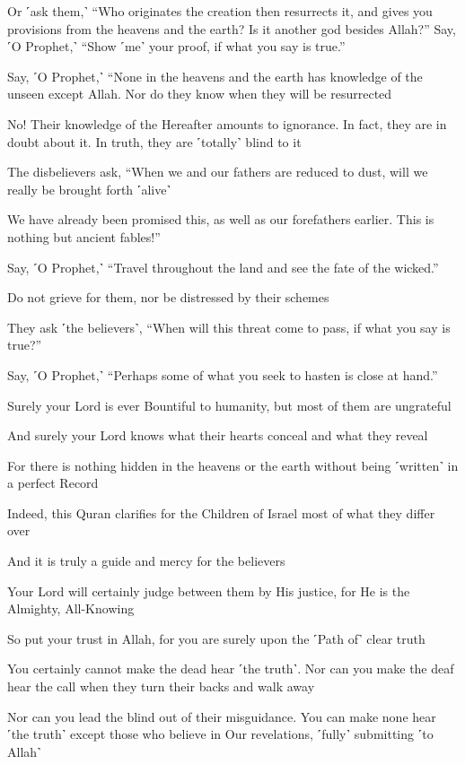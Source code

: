 Or ˹ask them,˺ “Who originates the creation then resurrects it, and gives you provisions from the heavens and the earth? Is it another god besides Allah?” Say, ˹O Prophet,˺ “Show ˹me˺ your proof, if what you say is true.”

Say, ˹O Prophet,˺ “None in the heavens and the earth has knowledge of the unseen except Allah. Nor do they know when they will be resurrected

No! Their knowledge of the Hereafter amounts to ignorance. In fact, they are in doubt about it. In truth, they are ˹totally˺ blind to it

The disbelievers ask, “When we and our fathers are reduced to dust, will we really be brought forth ˹alive˺

We have already been promised this, as well as our forefathers earlier. This is nothing but ancient fables!”

Say, ˹O Prophet,˺ “Travel throughout the land and see the fate of the wicked.”

Do not grieve for them, nor be distressed by their schemes

They ask ˹the believers˺, “When will this threat come to pass, if what you say is true?”

Say, ˹O Prophet,˺ “Perhaps some of what you seek to hasten is close at hand.”

Surely your Lord is ever Bountiful to humanity, but most of them are ungrateful

And surely your Lord knows what their hearts conceal and what they reveal

For there is nothing hidden in the heavens or the earth without being ˹written˺ in a perfect Record

Indeed, this Quran clarifies for the Children of Israel most of what they differ over

And it is truly a guide and mercy for the believers

Your Lord will certainly judge between them by His justice, for He is the Almighty, All-Knowing

So put your trust in Allah, for you are surely upon the ˹Path of˺ clear truth

You certainly cannot make the dead hear ˹the truth˺. Nor can you make the deaf hear the call when they turn their backs and walk away

Nor can you lead the blind out of their misguidance. You can make none hear ˹the truth˺ except those who believe in Our revelations, ˹fully˺ submitting ˹to Allah˺


